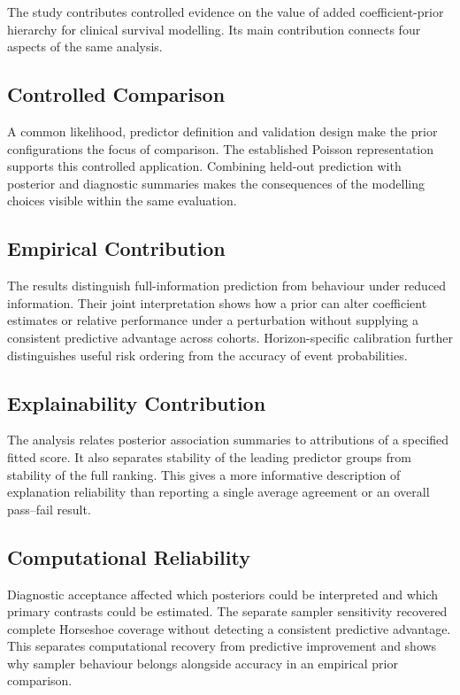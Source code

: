 The study contributes controlled evidence on the value of added coefficient-prior hierarchy for clinical survival modelling. Its main contribution connects four aspects of the same analysis.

\subsection{Controlled Comparison}\label{methodological-contribution}

A common likelihood, predictor definition and validation design make the prior configurations the focus of comparison. The established Poisson representation supports this controlled application. Combining held-out prediction with posterior and diagnostic summaries makes the consequences of the modelling choices visible within the same evaluation.

\subsection{Empirical Contribution}\label{empirical-contribution}

The results distinguish full-information prediction from behaviour under reduced information. Their joint interpretation shows how a prior can alter coefficient estimates or relative performance under a perturbation without supplying a consistent predictive advantage across cohorts. Horizon-specific calibration further distinguishes useful risk ordering from the accuracy of event probabilities.

\subsection{Explainability Contribution}\label{explainability-contribution}

The analysis relates posterior association summaries to attributions of a specified fitted score. It also separates stability of the leading predictor groups from stability of the full ranking. This gives a more informative description of explanation reliability than reporting a single average agreement or an overall pass--fail result.

\subsection{Computational Reliability}\label{methodological-integrity-contribution}

Diagnostic acceptance affected which posteriors could be interpreted and which primary contrasts could be estimated. The separate sampler sensitivity recovered complete Horseshoe coverage without detecting a consistent predictive advantage. This separates computational recovery from predictive improvement and shows why sampler behaviour belongs alongside accuracy in an empirical prior comparison.

